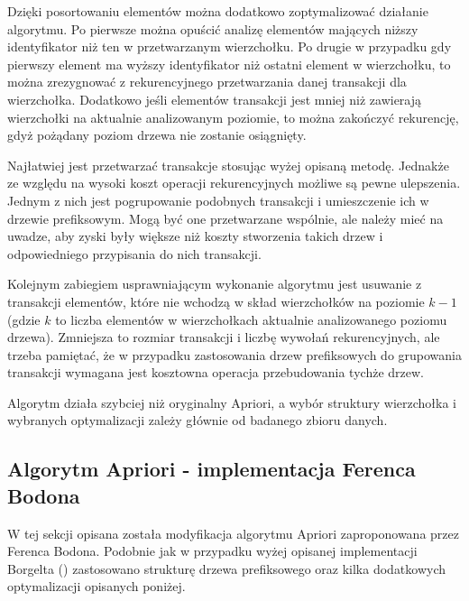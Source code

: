 Dzięki posortowaniu elementów można dodatkowo zoptymalizować działanie algorytmu. Po pierwsze można opuścić analizę elementów mających niższy identyfikator niż ten w przetwarzanym wierzchołku. Po drugie w przypadku gdy pierwszy element ma wyższy identyfikator niż ostatni element w wierzchołku, to można zrezygnować z rekurencyjnego przetwarzania danej transakcji dla wierzchołka. Dodatkowo jeśli elementów transakcji jest mniej niż zawierają wierzchołki na aktualnie analizowanym poziomie, to można zakończyć rekurencję, gdyż pożądany poziom drzewa nie zostanie osiągnięty.

Najłatwiej jest przetwarzać transakcje stosując wyżej opisaną metodę. Jednakże ze względu na wysoki koszt operacji rekurencyjnych możliwe są pewne ulepszenia. Jednym z nich jest pogrupowanie podobnych transakcji i umieszczenie ich w drzewie prefiksowym. Mogą być one przetwarzane wspólnie, ale należy mieć na uwadze, aby zyski były większe niż koszty stworzenia takich drzew i odpowiedniego przypisania do nich transakcji. 

Kolejnym zabiegiem usprawniającym wykonanie algorytmu jest usuwanie z transakcji elementów, które nie wchodzą w skład wierzchołków na poziomie \(k-1\) (gdzie \(k\) to liczba elementów w wierzchołkach aktualnie analizowanego poziomu drzewa). Zmniejsza to rozmiar transakcji i liczbę wywołań rekurencyjnych, ale trzeba pamiętać, że w przypadku zastosowania drzew prefiksowych do grupowania transakcji wymagana jest kosztowna operacja przebudowania tychże drzew.

Algorytm działa szybciej niż oryginalny Apriori, a wybór struktury wierzchołka i wybranych optymalizacji zależy głównie od badanego zbioru danych. 

\subsection{Algorytm Apriori - implementacja Ferenca Bodona \cite{Bodon}}
\label{c323}
W tej sekcji opisana została modyfikacja algorytmu Apriori zaproponowana przez Ferenca Bodona. Podobnie jak w przypadku wyżej opisanej implementacji Borgelta (\cite{Borgelt}) zastosowano strukturę drzewa prefiksowego oraz kilka dodatkowych optymalizacji opisanych poniżej. 

